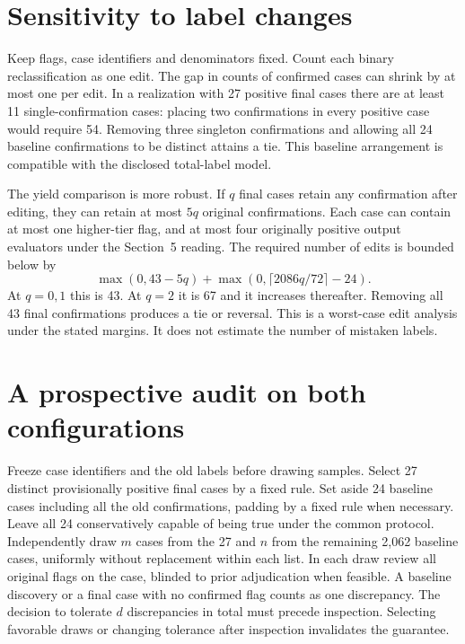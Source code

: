 \documentclass[11pt]{article}
\begin{document}
\section{Sensitivity to label changes}
Keep flags, case identifiers and denominators fixed. Count each binary reclassification as one edit. The gap in counts of confirmed cases can shrink by at most one per edit. In a realization with 27 positive final cases there are at least 11 single-confirmation cases: placing two confirmations in every positive case would require 54. Removing three singleton confirmations and allowing all 24 baseline confirmations to be distinct attains a tie. This baseline arrangement is compatible with the disclosed total-label model.

The yield comparison is more robust. If $q$ final cases retain any confirmation after editing, they can retain at most $5q$ original confirmations. Each case can contain at most one higher-tier flag, and at most four originally positive output evaluators under the Section~5 reading. The required number of edits is bounded below by
\[
  \max(0,43-5q)+\max(0,\lceil 2086q/72\rceil-24).
\]
At $q=0,1$ this is 43. At $q=2$ it is 67 and it increases thereafter. Removing all 43 final confirmations produces a tie or reversal. This is a worst-case edit analysis under the stated margins. It does not estimate the number of mistaken labels.
\section{A prospective audit on both configurations}
Freeze case identifiers and the old labels before drawing samples. Select 27 distinct provisionally positive final cases by a fixed rule. Set aside 24 baseline cases including all the old confirmations, padding by a fixed rule when necessary. Leave all 24 conservatively capable of being true under the common protocol. Independently draw $m$ cases from the 27 and $n$ from the remaining 2,062 baseline cases, uniformly without replacement within each list. In each draw review all original flags on the case, blinded to prior adjudication when feasible. A baseline discovery or a final case with no confirmed flag counts as one discrepancy. The decision to tolerate $d$ discrepancies in total must precede inspection. Selecting favorable draws or changing tolerance after inspection invalidates the guarantee.
\end{document}
